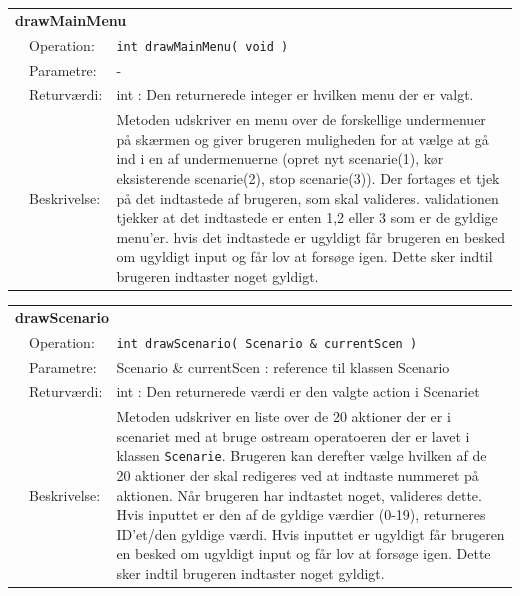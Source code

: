 \begin{table}[h]
\begin{tabularx}{\textwidth}{p{0.6 cm} l X} %
\multicolumn{3}{l}{\textbf{drawMainMenu}}\\
& Operation: & 
\texttt{int drawMainMenu( void )} 
\\ & Parametre: & 
 -
\\ & Returværdi: & 
int : Den returnerede integer er hvilken menu der er valgt.
\\ & Beskrivelse: & 
Metoden udskriver en menu over de forskellige undermenuer på skærmen og giver brugeren muligheden for at vælge at gå ind i en af undermenuerne (opret nyt scenarie(1), kør eksisterende scenarie(2), stop scenarie(3)). Der fortages et tjek på det indtastede af brugeren, som skal valideres. validationen tjekker at det indtastede er enten 1,2 eller 3 som er de gyldige menu'er. hvis det indtastede er ugyldigt får brugeren en besked om ugyldigt input og får lov at forsøge igen. Dette sker indtil brugeren indtaster noget gyldigt.
\\
\end{tabularx}
\end{table}

\begin{table}[h]
\begin{tabularx}{\textwidth}{p{0.6 cm} l X} %
\multicolumn{3}{l}{\textbf{drawScenario}}\\
& Operation: & 
\texttt{int drawScenario( Scenario \& currentScen )} 
\\ & Parametre: & 
Scenario \& currentScen : reference til klassen Scenario
\\ & Returværdi: & 
int : Den returnerede værdi er den valgte action i Scenariet
\\ & Beskrivelse: & 
Metoden udskriver en liste over de 20 aktioner der er i scenariet med at bruge ostream operatoeren der er lavet i klassen \texttt{Scenarie}. Brugeren kan derefter vælge hvilken af de 20 aktioner der skal redigeres ved at indtaste nummeret på aktionen. Når brugeren har indtastet noget, valideres dette. Hvis inputtet er den af de gyldige værdier (0-19), returneres ID'et/den gyldige værdi. Hvis inputtet er ugyldigt får brugeren en besked om ugyldigt input og får lov at forsøge igen. Dette sker indtil brugeren indtaster noget gyldigt.
\\
\end{tabularx}
\end{table}

